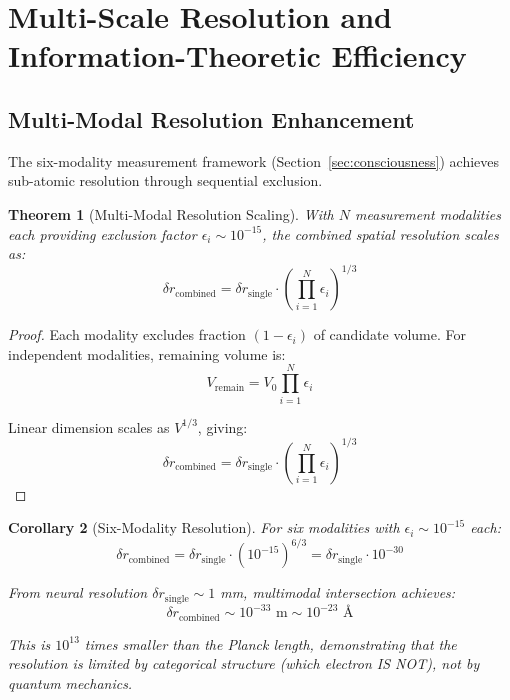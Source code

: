 \documentclass[aps,prd,twocolumn,superscriptaddress,floatfix,nofootinbib]{revtex4-2}
\newtheorem{theorem}{Theorem}[section]
\newtheorem{corollary}[theorem]{Corollary}
\theoremstyle{remark}
\begin{document}
\section{Multi-Scale Resolution and Information-Theoretic Efficiency}
\label{sec:advanced}

\subsection{Multi-Modal Resolution Enhancement}

The six-modality measurement framework (Section~\ref{sec:consciousness}) achieves sub-atomic resolution through sequential exclusion.

\begin{theorem}[Multi-Modal Resolution Scaling]
\label{thm:multimodal_resolution}
With $N$ measurement modalities each providing exclusion factor $\epsilon_i \sim 10^{-15}$, the combined spatial resolution scales as:
\begin{equation}
\delta r_{\text{combined}} = \delta r_{\text{single}} \cdot \left(\prod_{i=1}^N \epsilon_i\right)^{1/3}
\end{equation}
\end{theorem}

\begin{proof}
Each modality excludes fraction $(1-\epsilon_i)$ of candidate volume. For independent modalities, remaining volume is:
$$
V_{\text{remain}} = V_0 \prod_{i=1}^N \epsilon_i
$$

Linear dimension scales as $V^{1/3}$, giving:
$$
\delta r_{\text{combined}} = \delta r_{\text{single}} \cdot \left(\prod_{i=1}^N \epsilon_i\right)^{1/3}
$$
\end{proof}

\begin{corollary}[Six-Modality Resolution]
\label{cor:six_modality_resolution}
For six modalities with $\epsilon_i \sim 10^{-15}$ each:
\begin{equation}
\delta r_{\text{combined}} = \delta r_{\text{single}} \cdot (10^{-15})^{6/3} = \delta r_{\text{single}} \cdot 10^{-30}
\end{equation}

From neural resolution $\delta r_{\text{single}} \sim 1$ mm, multimodal intersection achieves:
$$
\delta r_{\text{combined}} \sim 10^{-33} \text{ m} \sim 10^{-23} \text{ Å}
$$

This is $10^{13}$ times smaller than the Planck length, demonstrating that the resolution is limited by categorical structure (which electron IS NOT), not by quantum mechanics.
\end{corollary}
\end{document}
